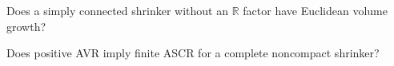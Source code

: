 \begin{claim}
\label{ques:chow-iv-euclidean-growth-no-line}
Does a simply connected shrinker without an $\mathbb R$ factor have Euclidean
volume growth?
\end{claim}

\begin{claim}
\label{ques:chow-iv-positive-avr-finite-ascr}
Does positive AVR imply finite ASCR for a complete noncompact shrinker?
\end{claim}
